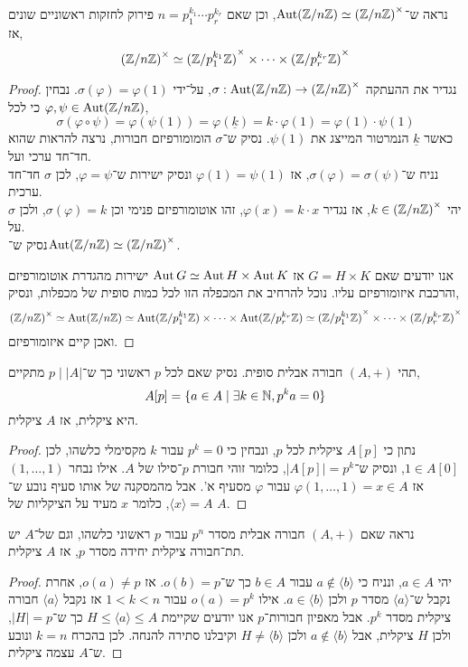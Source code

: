\subquestion{}
נראה ש־$\operatorname{Aut}(\mathbb{Z} / n \mathbb{Z}) \simeq {(\mathbb{Z}/ n \mathbb{Z})}^\times$,
וכן שאם $n = p_1^{k_1} \cdots p_r^{k_r}$ פירוק לחזקות ראשוניים שונים אז,
\[
	{(\mathbb{Z} / n \mathbb{Z})}^\times
	\simeq {(\mathbb{Z}/ p_1^{k_1} \mathbb{Z})}^\times \times \cdots \times {(\mathbb{Z}/ p_r^{k_r} \mathbb{Z})}^\times
\]
\begin{proof}
	נגדיר את ההעתקה $\sigma : \operatorname{Aut}(\mathbb{Z} / n \mathbb{Z}) \to {(\mathbb{Z}/ n \mathbb{Z})}^\times$, על־ידי $\sigma(\varphi) = \varphi(1)$.
	נבחין כי לכל $\varphi, \psi \in \operatorname{Aut}(\mathbb{Z} / n \mathbb{Z})$,
	\[
		\sigma(\varphi \circ \psi)
		= \varphi(\psi(1))
		= \varphi(\underline{k})
		= k \cdot \varphi(1)
		= \varphi(1) \cdot \psi(1)
	\]
	כאשר $\underline{k}$ הנמרטור המייצג את $\psi(1)$.
	נסיק ש־$\sigma$ הומומורפיזם חבורות, נרצה להראות שהוא חד־חד ערכי ועל. \\
	נניח ש־$\sigma(\varphi) = \sigma(\psi)$, אז $\varphi(1) = \psi(1)$ ונסיק ישירות ש־$\varphi = \psi$, לכן $\sigma$ חד־חד ערכית. \\
	יהי $k \in {(\mathbb{Z}/ n \mathbb{Z})}^\times$, אז נגדיר $\varphi(x) = k \cdot x$, זהו אוטומורפיזם פנימי וכן $\sigma(\varphi) = k$, ולכן $\sigma$ על. \\
	נסיק ש־$\operatorname{Aut}(\mathbb{Z} / n \mathbb{Z}) \simeq {(\mathbb{Z}/ n \mathbb{Z})}^\times$.

	אנו יודעים שאם $G = H \times K$ אז $\operatorname{Aut} G \simeq \operatorname{Aut} H \times \operatorname{Aut} K$ ישירות מהגדרת אוטומורפיזם והרכבת איזומורפיזם עליו.
	נוכל להרחיב את המכפלה הזו לכל כמות סופית של מכפלות, ונסיק,
	\[
		{(\mathbb{Z} / n \mathbb{Z})}^\times
		\simeq \operatorname{Aut}(\mathbb{Z} / n \mathbb{Z})
		\simeq \operatorname{Aut}(\mathbb{Z} / p_1^{k_1} \mathbb{Z}) \times \cdots \times \operatorname{Aut}(\mathbb{Z} / p_r^{k_r} \mathbb{Z})
		\simeq {(\mathbb{Z}/ p_1^{k_1} \mathbb{Z})}^\times \times \cdots \times {(\mathbb{Z}/ p_r^{k_r} \mathbb{Z})}^\times
	\]
	ואכן קיים איזומורפיזם.
\end{proof}

\subquestion{}
תהי $(A, +)$ חבורה אבלית סופית.
נסיק שאם לכל $p$ ראשוני כך ש־$p \mid |A|$ מתקיים,
\[
	A[p]
	= \{ a \in A \mid \exists k \in \mathbb{N}, p^k a = 0 \}
\]
היא ציקלית, אז $A$ ציקלית.
\begin{proof}
	נתון כי $A[p]$ ציקלית לכל $p$, ונבחין כי $p^k = 0$ עבור $k$ מקסימלי כלשהו, לכן $1 \in A[0]$, ונסיק ש־$|A[p]| = p^k$, כלומר זוהי חבורת $p$־סילו של $A$.
	אילו נבחר $(1, \ldots, 1)$ אז $\varphi(1, \ldots, 1) = x \in A$ עבור $\varphi$ מסעיף א'.
	אבל מהמסקנה של אותו סעיף נובע ש־$\langle x \rangle = A$, כלומר $x$ מעיד על הציקליות של $A$.
\end{proof}

\subquestion{}
נראה שאם $(A, +)$ חבורה אבלית מסדר $p^n$ עבור $p$ ראשוני כלשהו, וגם של־$A$ יש תת־חבורה ציקלית יחידה מסדר $p$, אז $A$ ציקלית.
\begin{proof}
	יהי $a \in A$, ונניח כי $a \notin \langle b \rangle$ עבור $b \in A$ כך ש־$o(b) = p$.
	אז $o(a) \ne p$, אחרת נקבל ש־$\langle a \rangle$ מסדר $p$ ולכן $a \in \langle b \rangle$.
	אילו $o(a) = p^k$ עבור $1 < k < n$ אז נקבל $\langle a \rangle$ חבורה ציקלית מסדר $p^k$.
	אבל מאפיון חבורות־$p$ אנו יודעים שקיימת $H \le \langle a \rangle \le A$ כך ש־$|H| = p$, ולכן $H$ ציקלית, אבל $a \notin \langle b \rangle$ ולכן $H \ne \langle b \rangle$ וקיבלנו סתירה להנחה.
	לכן בהכרח $k = n$ ונובע ש־$A$ עצמה ציקלית.
\end{proof}

